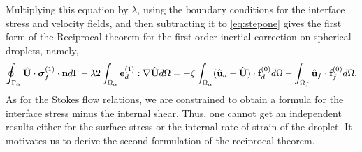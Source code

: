 Multiplying this equation by $\lambda$, using the boundary conditions  for the interface stress and velocity fields, and then subtracting it to \ref{eq:stepone} gives the first form of the Reciprocal theorem for the first order inertial correction on spherical droplets, namely,
\begin{equation}
    \intS{\hat{\textbf{U}}\cdot  \bm\sigma_f^{(1)} \cdot \textbf{n}}
    -\lambda 2 \intO{ \textbf{e}_d^{(1)} : \grad \hat{\textbf{U}} }
    = 
    - \zeta \intO{(\hat{\textbf{u}}_d - \hat{\textbf{U}}) \cdot \textbf{f}_d^{(0)}}
    - \intOf{\hat{\textbf{u}}_f\cdot  \textbf{f}^{(0)}_f}.
    \label{eq:reciprocal_f_one}
\end{equation}
As for the Stokes flow relations, we are constrained to obtain a formula for the interface stress minus the internal shear.
Thus, one cannot get an independent results either for the surface stress or the internal rate of strain of the droplet.  
It motivates us to derive the second formulation of the reciprocal theorem.

